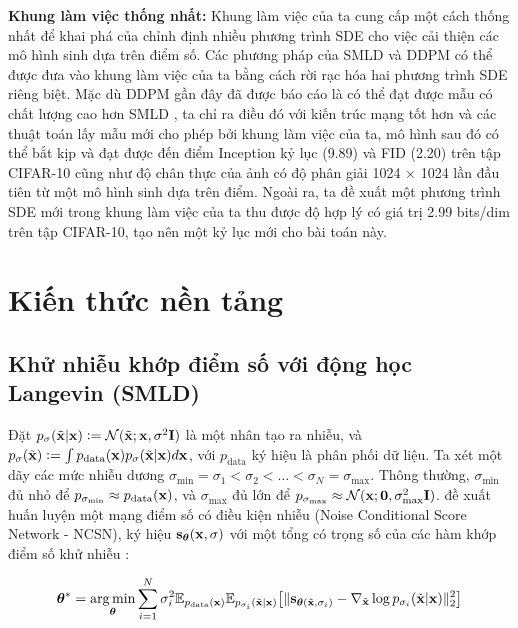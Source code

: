 \documentclass{article} %
\begin{document}
\textbf{Khung làm việc thống nhất:} Khung làm việc của ta cung cấp một cách thống nhất để khai phá của chỉnh định nhiều phương trình SDE cho việc cải thiện các mô hình sinh dựa trên điểm số.
Các phương pháp của SMLD và DDPM có thể được đưa vào khung làm việc của ta bằng cách rời rạc hóa hai phương trình SDE riêng biệt.
Mặc dù DDPM \citep{ho2020denoising} gần đây đã được báo cáo là có thể đạt được mẫu có chất lượng cao hơn SMLD \citep{song2019generative,song2020improved}, ta chỉ ra điều đó với kiến trúc mạng tốt hơn và các thuật toán lấy mẫu mới cho phép bởi khung làm việc của ta, mô hình sau đó có thể bắt kịp và đạt được đến điểm Inception kỷ lục (9.89) và FID (2.20) trên tập CIFAR-10 cũng như độ chân thực của ảnh có độ phân giải 1024 $\times$ 1024 lần đầu tiên từ một mô hình sinh dựa trên điểm.
Ngoài ra, ta đề xuất một phương trình SDE mới trong khung làm việc của ta thu được độ hợp lý có giá trị 2.99 bits/dim trên tập CIFAR-10, tạo nên một kỷ lục mới cho bài toán này.

\section{Kiến thức nền tảng} \label{2}

\subsection{Khử nhiễu khớp điểm số với động học Langevin (SMLD)} \label{2.1}

Đặt $p_{\sigma}(\tilde{\bold{x}} \vert \bold{x}) \vcentcolon = \mathcal{N}(\tilde{\bold{x}};\bold{x}, \sigma^2 \bold{I})$ là một nhân tạo ra nhiễu, và $p_{\sigma}(\tilde{\bold{x}})\vcentcolon = \int p_{\mathrm{data}}(\bold{x}) p_{\sigma}(\tilde{\bold{x}} \vert \bold{x}) d \bold{x}$, với $p_{\mathrm{data}}$ ký hiệu là phân phối dữ liệu.
Ta xét một dãy các mức nhiễu dương $\sigma_{\min} = \sigma_1 < \sigma_2 < \dots < \sigma_N = \sigma_{\max}$.
Thông thường, $\sigma_{\min}$ đủ nhỏ để $p_{\sigma_{\min}} \approx p_{\mathrm{data}}(\bold{x})$, và $\sigma_{\max}$ đủ lớn để $p_{\sigma_{\max}}\approx \mathcal{N}(\bold{x}; \bold{0}, \sigma_{\max}^2 \bold{I})$.
\citep{song2019generative} đề xuất huấn luyện một mạng điểm số có điều kiện nhiễu (Noise Conditional Score Network - NCSN), ký hiệu $\bold{s}_{\boldsymbol{\theta}}(\bold{x}, \sigma)$ với một tổng có trọng số của các hàm khớp điểm số khử nhiễu \citep{vincent2011connection}:

\begin{equation} \label{eq:1}
    \boldsymbol{\theta}^{\ast} = \operatorname*{arg\,min}_{\boldsymbol{\theta}} \sum_{i=1}^N \sigma_i^2 \mathbb{E}_{p_{\mathrm{data}}(\bold{x})} \mathbb{E}_{p_{\sigma_i}(\tilde{\bold{x}} \vert \bold{x})} \big\lbrack \lVert \bold{s}_{\boldsymbol{\theta} (\tilde{\bold{x}}, \sigma_i)} - \nabla_{\tilde{\bold{x}}} \log p_{\sigma_i} (\tilde{\bold{x}} \vert \bold{x})  \rVert_2^2 \big\rbrack
\end{equation}
\end{document}
